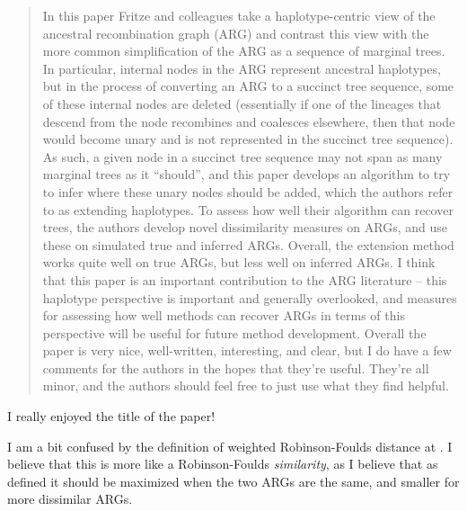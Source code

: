 \begin{quote}
In this paper Fritze and colleagues take a haplotype-centric view of the ancestral recombination graph (ARG) and contrast this view with the more common simplification of the ARG as a sequence of marginal trees. In particular, internal nodes in the ARG represent ancestral haplotypes, but in the process of converting an ARG to a succinct tree sequence, some of these internal nodes are deleted (essentially if one of the lineages that descend from the node recombines and coalesces elsewhere, then that node would become unary and is not represented in the succinct tree sequence). As such, a given node in a succinct tree sequence may not span as many marginal trees as it ``should'', and this paper develops an algorithm to try to infer where these unary nodes should be added, which the authors refer to as extending haplotypes. To assess how well their algorithm can recover trees, the authors develop novel dissimilarity measures on ARGs, and use these on simulated true and inferred ARGs. Overall, the extension method works quite well on true ARGs, but less well on inferred ARGs. I think that this paper is an important contribution to the ARG literature -- this haplotype perspective is important and generally overlooked, and measures for assessing how well methods can recover ARGs in terms of this perspective will be useful for future method development. Overall the paper is very nice, well-written, interesting, and clear, but I do have a few comments for the authors in the hopes that they're useful. They're all minor, and the authors should feel free to just use what they find helpful.
\end{quote}

\begin{point}{}
 I really enjoyed the title of the paper!
\end{point}


\begin{point}{\revref}
 I am a bit confused by the definition of weighted Robinson-Foulds distance at \revref.%
I believe that this is more like a Robinson-Foulds \emph{similarity}, as I believe that as defined it should be maximized when the two ARGs are the same, and smaller for more dissimilar ARGs.
\end{point}


